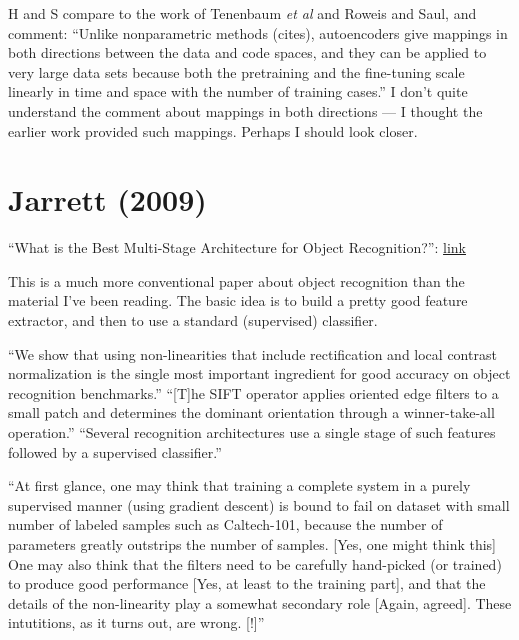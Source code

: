 \documentclass[12pt]{report}
\newcommand{\link}[2]{\href{#1}{#2}}
\begin{document}
H and S compare to the work of Tenenbaum \emph{et al} and Roweis and
Saul, and comment: ``Unlike nonparametric methods (cites),
autoencoders give mappings in both directions between the data and
code spaces, and they can be applied to very large data sets because
both the pretraining and the fine-tuning scale linearly in time and
space with the number of training cases.''  I don't quite understand
the comment about mappings in both directions --- I thought the
earlier work provided such mappings.  Perhaps I should look closer.

\section{Jarrett (2009)}

``What is the Best Multi-Stage Architecture for Object Recognition?'':
\link{http://yann.lecun.com/exdb/publis/pdf/jarrett-iccv-09.pdf}{link}

This is a much more conventional paper about object recognition than
the material I've been reading.  The basic idea is to build a pretty
good feature extractor, and then to use a standard (supervised)
classifier.

``We show that using non-linearities that include rectification and
local contrast normalization is the single most important ingredient
for good accuracy on object recognition benchmarks.''  ``[T]he SIFT
operator applies oriented edge filters to a small patch and determines
the dominant orientation through a winner-take-all operation.''
``Several recognition architectures use a single stage of such
features followed by a supervised classifier.''

``At first glance, one may think that training a complete system in a
purely supervised manner (using gradient descent) is bound to fail on
dataset with small number of labeled samples such as Caltech-101,
because the number of parameters greatly outstrips the number of
samples.  [Yes, one might think this] One may also think that the
filters need to be carefully hand-picked (or trained) to produce good
performance [Yes, at least to the training part], and that the details
of the non-linearity play a somewhat secondary role [Again, agreed].
These intutitions, as it turns out, are wrong. [!]''
\end{document}
